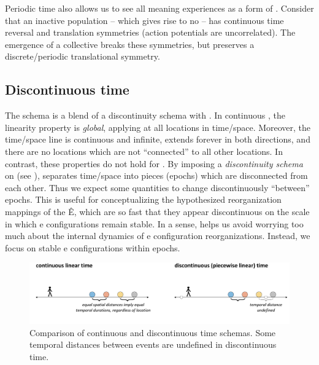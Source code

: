   Periodic time also allows us to see all meaning experiences as a form of . Consider that an inactive population -- which gives rise to no  -- has continuous time reversal and translation symmetries (action potentials are uncorrelated). The emergence of a collective  breaks these symmetries, but preserves a discrete/periodic translational symmetry.

\subsection{Discontinuous time}

The  schema is a blend of a discontinuity schema with . In continuous , the linearity property is \textit{global}, applying at all locations in time/space. Moreover, the time/space line is continuous and infinite, extends forever in both directions, and there are no locations which are not “connected” to all other locations. In contrast, these properties do not hold for . By imposing a \textit{discontinuity schema} on  (see {}),  separates time/space into pieces (epochs) which are disconnected from each other. Thus we expect some  quantities to change discontinuously “between” epochs. This is useful for conceptualizing the hypothesized reorganization mappings of the  Ê, which are so fast that they appear discontinuous on the scale in which e configurations remain stable. In a sense,  helps us avoid worrying too much about the internal dynamics of e configuration reorganizations. Instead, we focus on stable e configurations within epochs.

  
\begin{figure}
\includegraphics[width=\textwidth]{figures/Tilsen-img49.png}
\caption{Comparison of continuous and discontinuous time schemas. Some temporal distances between events are undefined in discontinuous time.}
\label{fig:3:21}
\end{figure}
 


